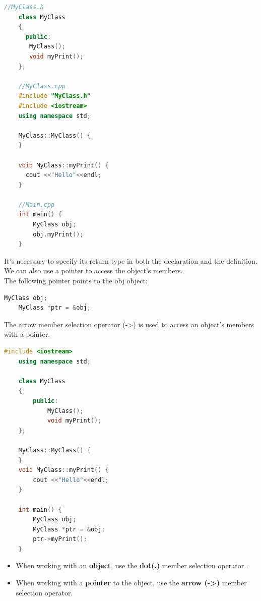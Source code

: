 \documentclass[12pt , a4paper]{article}
\begin{document}
	\begin{lstlisting}[language=C++]
	//MyClass.h
	class MyClass
	{
	  public:
	   MyClass();
	   void myPrint();
	};

	//MyClass.cpp
	#include "MyClass.h"
	#include <iostream>
	using namespace std;
	
	MyClass::MyClass() {
	}
	
	void MyClass::myPrint() {
	  cout <<"Hello"<<endl;
	}

	//Main.cpp
	int main() {
	    MyClass obj;
	    obj.myPrint();
	}
	\end{lstlisting}
It's necessary to specify its return type in both the declaration and the definition.\\
We can also use a pointer to access the object's members.\\
The following pointer points to the obj object:
	\begin{lstlisting}[language=C++]
	MyClass obj;
	MyClass *ptr = &obj;
	\end{lstlisting}
The arrow member selection operator (->) is used to access an object's members with a pointer.
	\begin{lstlisting}[language=C++]
	#include <iostream>
	using namespace std;
	
	class MyClass
	{
	    public:
	        MyClass();
	        void myPrint();
	};
	
	MyClass::MyClass() {
	}
	void MyClass::myPrint() {
	    cout <<"Hello"<<endl;
	}
	
	int main() {
	    MyClass obj;
	    MyClass *ptr = &obj;
	    ptr->myPrint();
	}
	\end{lstlisting}
	\begin{itemize}
		\item When working with an \textbf{object}, use the \textbf{dot(.)} member selection operator .\\
		\item When working with a \textbf{pointer} to the object, use the \textbf{arrow (->)} member selection operator.
	\end{itemize}
\end{document}
